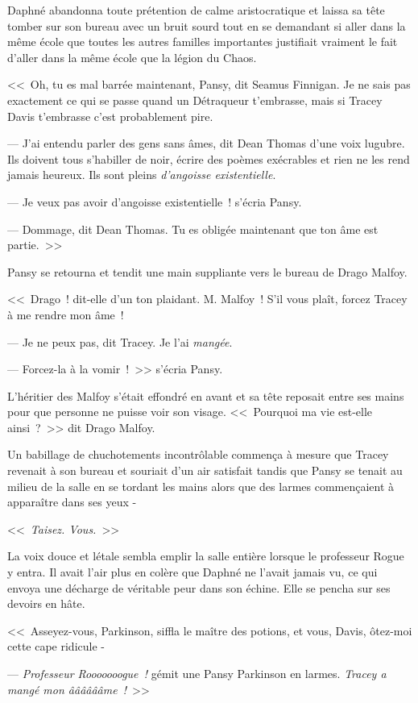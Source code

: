 Daphné abandonna toute prétention de calme aristocratique et laissa sa tête tomber sur son bureau avec un bruit sourd tout en se demandant si aller dans la même école que toutes les autres familles importantes justifiait vraiment le fait d'aller dans la même école que la légion du Chaos.

<<~Oh, tu es mal barrée maintenant, Pansy, dit Seamus Finnigan. Je ne sais pas exactement ce qui se passe quand un Détraqueur t'embrasse, mais si Tracey Davis t'embrasse c'est probablement pire.

--- J'ai entendu parler des gens sans âmes, dit Dean Thomas d'une voix lugubre. Ils doivent tous s'habiller de noir, écrire des poèmes exécrables et rien ne les rend jamais heureux. Ils sont pleins \emph{d'angoisse existentielle}.

--- Je veux pas avoir d'angoisse existentielle~! s'écria Pansy.

--- Dommage, dit Dean Thomas. Tu es obligée maintenant que ton âme est partie.~>>

Pansy se retourna et tendit une main suppliante vers le bureau de Drago Malfoy.

<<~Drago~! dit-elle d'un ton plaidant. M. Malfoy~! S'il vous plaît, forcez Tracey à me rendre mon âme~!

--- Je ne peux pas, dit Tracey. Je l'ai \emph{mangée}.

--- Forcez-la à la vomir~!~>> s'écria Pansy.

L'héritier des Malfoy s'était effondré en avant et sa tête reposait entre ses mains pour que personne ne puisse voir son visage. <<~Pourquoi ma vie est-elle ainsi~?~>> dit Drago Malfoy.

Un babillage de chuchotements incontrôlable commença à mesure que Tracey revenait à son bureau et souriait d'un air satisfait tandis que Pansy se tenait au milieu de la salle en se tordant les mains alors que des larmes commençaient à apparaître dans ses yeux -

<<~\emph{Taisez. Vous.}~>>

La voix douce et létale sembla emplir la salle entière lorsque le professeur Rogue y entra. Il avait l'air plus en colère que Daphné ne l'avait jamais vu, ce qui envoya une décharge de véritable peur dans son échine. Elle se pencha sur ses devoirs en hâte.

<<~Asseyez-vous, Parkinson, siffla le maître des potions, et vous, Davis, ôtez-moi cette cape ridicule -

--- \emph{Professeur Rooooooogue~!} gémit une Pansy Parkinson en larmes. \emph{Tracey a mangé mon ââââââme~!}~>>
